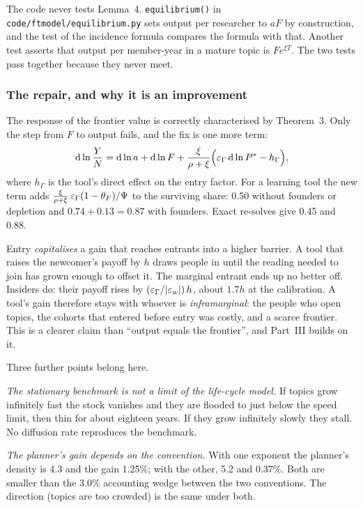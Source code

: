 \begin{notebox}
The code never tests Lemma~4. \texttt{equilibrium()} in \texttt{code/ftmodel/equilibrium.py} sets output per researcher to $aF$ by construction, and the test of the incidence formula compares the formula with that. Another test asserts that output per member-year in a mature topic is $F e^{\xi T}$. The two tests pass together because they never meet.
\end{notebox}

\subsubsection{The repair, and why it is an improvement}
The response of the frontier value is correctly characterised by Theorem~3. Only the step from $F$ to output fails, and the fix is one more term:
\[
\mathrm{d}\ln\frac{Y}{N}=\mathrm{d}\ln a+\mathrm{d}\ln F+\frac{\xi}{\rho+\xi}\Bigl(\varepsilon_\Gamma\,\mathrm{d}\ln P^*-h_\Gamma\Bigr),
\]
where $h_\Gamma$ is the tool's direct effect on the entry factor. For a learning tool the new term adds $\frac{\xi}{\rho+\xi}\,\varepsilon_\Gamma(1-\theta_F)/\Psi$ to the surviving share: 0.50 without founders or depletion and $0.74+0.13=0.87$ with founders. Exact re-solves give 0.45 and 0.88.

\begin{ideabox}
Entry \emph{capitalises} a gain that reaches entrants into a higher barrier. A tool that raises the newcomer's payoff by $h$ draws people in until the reading needed to join has grown enough to offset it. The marginal entrant ends up no better off. Insiders do: their payoff rises by $(\varepsilon_\Gamma/|\varepsilon_w|)\,h$, about $1.7h$ at the calibration. A tool's gain therefore stays with whoever is \emph{inframarginal}: the people who open topics, the cohorts that entered before entry was costly, and a scarce frontier. This is a clearer claim than ``output equals the frontier'', and Part~III builds on it.
\end{ideabox}

Three further points belong here.

\emph{The stationary benchmark is not a limit of the life-cycle model.} If topics grow infinitely fast the stock vanishes and they are flooded to just below the speed limit, then thin for about eighteen years. If they grow infinitely slowly they stall. No diffusion rate reproduces the benchmark.

\emph{The planner's gain depends on the convention.} With one exponent the planner's density is 4.3 and the gain 1.25\%; with the other, 5.2 and 0.37\%. Both are smaller than the 3.0\% accounting wedge between the two conventions. The direction (topics are too crowded) is the same under both.

